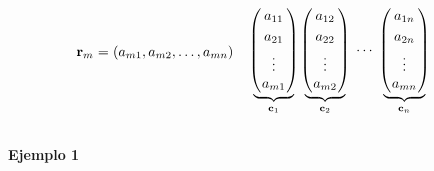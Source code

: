 {\begin{frame}
\begin{columns}[c]
\begin{column}{1.15\textwidth}
\[\begin{array}{@{\hspace{0.1\tabcolsep}}c@{\hspace{2\tabcolsep}}c@{\hspace{2\tabcolsep}}c@{\hspace{0.1\tabcolsep}}}
\begin{array}{@{\hspace{0.1\tabcolsep}}c@{\hspace{0.5\tabcolsep}}c@{\hspace{0.5\tabcolsep}}l@{\hspace{0.1\tabcolsep}}}
		\mathbf{r}_m  & = & (a_{m1},a_{m2},\hdots, a_{mn})\\[1.1cm]
		\end{array}
		& 
		{
		\begin{array}{@{\hspace{0.1\tabcolsep}}c@{\hspace{1.3\tabcolsep}}c@{\hspace{1.3\tabcolsep}}c@{\hspace{1.3\tabcolsep}}c@{\hspace{0.1\tabcolsep}}}\\[8mm]
		\underbrace{\!\!
		\left(
		\begin{array}{@{\hspace{0.1\tabcolsep}}c@{\hspace{0.1\tabcolsep}}}
		a_{11}\\[1mm]
		a_{21}\\[1mm]
		\vdots \\[0mm]
		a_{m1}
		\end{array}
		\right)
		\!\!}_{\mathbf{c}_1}
		& 
		\underbrace{\!\!
		\left(
		\begin{array}{@{\hspace{0.1\tabcolsep}}c@{\hspace{0.1\tabcolsep}}}
		a_{12}\\[1mm]
		a_{22}\\[1mm]
		\vdots \\[0mm]
		a_{m2}
		\end{array}
		\right)
		\!\!}_{\mathbf{c}_2}
		& 
		\cdots
		& 
		\underbrace{\!\!
		\left(
		\begin{array}{@{\hspace{0.1\tabcolsep}}c@{\hspace{0.1\tabcolsep}}}
		a_{1n}\\[1mm]
		a_{2n}\\[1mm]
		\vdots \\[0mm]
		a_{mn}
		\end{array}
		\right)
		\!\!}_{\mathbf{c}_n}
		\end{array}
		\atop
		}				
		\end{array}		
		\]
	\end{column}
\end{columns}

\vspace{-2mm}

\begin{ej}{\textbf{Ejemplo 1}}
	
	\vspace{-2mm}
	

\end{ej}
\end{frame}}
